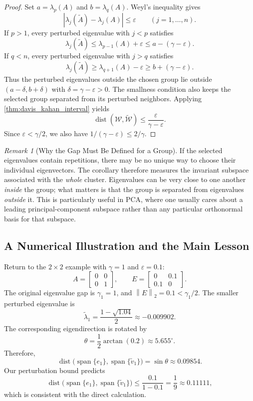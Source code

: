 \documentclass[14pt,letterpaper]{article}
\theoremstyle{plain}
\theoremstyle{definition}
\theoremstyle{remark}
\newtheorem{remark}[theorem]{Remark}
\newcommand{\norm}[1]{\left\lVert #1 \right\rVert}
\newcommand{\abs}[1]{\left| #1 \right|}
\DeclareMathOperator{\Span}{span}
\DeclareMathOperator{\dist}{dist}
\begin{document}
\begin{proof}
Set $a=\lambda_p(A)$ and $b=\lambda_q(A)$.
Weyl's inequality gives
\[
\abs{\lambda_j(\widetilde A)-\lambda_j(A)}
\leq\varepsilon
\qquad (j=1,\ldots,n).
\]
If $p>1$, every perturbed eigenvalue with $j<p$
satisfies
\[
\lambda_j(\widetilde A)
\leq\lambda_{p-1}(A)+\varepsilon
\leq a-(\gamma-\varepsilon).
\]
If $q<n$, every perturbed eigenvalue with $j>q$
satisfies
\[
\lambda_j(\widetilde A)
\geq\lambda_{q+1}(A)-\varepsilon
\geq b+(\gamma-\varepsilon).
\]
Thus the perturbed eigenvalues outside the chosen
group lie outside
$(a-\delta,b+\delta)$ with
$\delta=\gamma-\varepsilon>0$.
The smallness condition also keeps the selected group
separated from its perturbed neighbors.
Applying \cref{thm:davis_kahan_interval} yields
\[
\dist(\mathcal W,\widetilde{\mathcal W})
\leq\frac{\varepsilon}{\gamma-\varepsilon}.
\]
Since $\varepsilon<\gamma/2$, we also have
$1/(\gamma-\varepsilon)\leq2/\gamma$.
\end{proof}

\begin{remark}[Why the Gap Must Be Defined for a Group]
If the selected eigenvalues contain repetitions,
there may be no unique way to choose their individual
eigenvectors. The corollary therefore measures the
invariant subspace associated with the \emph{whole}
cluster. Eigenvalues can be very close to one another
\emph{inside} the group; what matters is that the
group is separated from eigenvalues \emph{outside}
it. This is particularly useful in PCA, where one
usually cares about a leading principal-component
subspace rather than any particular orthonormal
basis for that subspace.
\end{remark}


\subsection{A Numerical Illustration and the Main Lesson}
\label{subsec:dk_example}

Return to the $2\times2$ example with
$\gamma=1$ and $\varepsilon=0.1$:
\[
A=\begin{bmatrix}0&0\\0&1\end{bmatrix},
\qquad
E=\begin{bmatrix}0&0.1\\0.1&0\end{bmatrix}.
\]
The original eigenvalue gap is $\gamma_1=1$, and
$\norm{E}_2=0.1<\gamma_1/2$.
The smaller perturbed eigenvalue is
\[
\widetilde\lambda_1
=\frac{1-\sqrt{1.04}}{2}\approx-0.009902.
\]
The corresponding eigendirection is rotated by
\[
\theta=\frac12\arctan(0.2)\approx5.655^\circ.
\]
Therefore,
\[
\boxed{
\dist\bigl(\Span\{e_1\},\Span\{\widetilde v_1\}\bigr)
=\sin\theta\approx0.09854.
}
\]
Our perturbation bound predicts
\[
\dist\bigl(\Span\{e_1\},\Span\{\widetilde v_1\}\bigr)
\leq\frac{0.1}{1-0.1}=\frac19\approx0.11111,
\]
which is consistent with the direct calculation.
\end{document}
